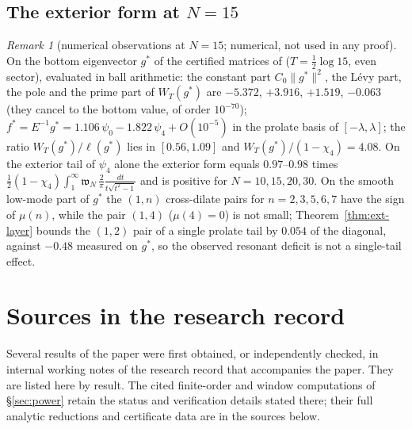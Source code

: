 \documentclass[11pt]{amsart}
\theoremstyle{definition}
\theoremstyle{remark}
\newtheorem{remark}[theorem]{Remark}
\begin{document}
\subsection{The exterior form at $N=15$}
\begin{remark}[numerical observations at $N=15$; numerical, not used in any proof]\label{rem:ext-latnum}
On the bottom eigenvector $g^*$ of the certified matrices of \cite{Mori15} ($T=\frac12\log15$, even sector), evaluated in
ball arithmetic: the constant part $C_0\|g^*\|^2$, the L\'evy part, the pole and the prime part of $W_T(g^*)$ are $-5.372$, $+3.916$, $+1.519$, $-0.063$ (they cancel to the bottom value, of order $10^{-70}$); $f^*=E^{-1}g^*=1.106\,\psi_0-1.822\,\psi_4+O(10^{-5})$ in the prolate basis of $[-\lambda,\lambda]$; the ratio
$W_T(g^*)/\ell(g^*)$ lies in $[0.56,1.09]$ and $W_T(g^*)/(1-\chi_4)=4.08$. On the exterior tail of $\psi_4$ alone the exterior form
equals $0.97$--$0.98$ times $\frac12(1-\chi_4)\int_1^\infty\mathfrak w_N\,\frac{2}{\pi}\frac{dt}{t\sqrt{t^2-1}}$ and is positive for
$N=10,15,20,30$. On the smooth low-mode part of $g^*$ the $(1,n)$ cross-dilate pairs for $n=2,3,5,6,7$ have the sign of $\mu(n)$,
while the pair $(1,4)$ ($\mu(4)=0$) is not small; Theorem~\ref{thm:ext-layer} bounds the $(1,2)$ pair of a single prolate tail by
$0.054$ of the diagonal, against $-0.48$ measured on $g^*$, so the observed resonant deficit is not a single-tail effect.
\end{remark}

\section{Sources in the research record}\label{app:sources}

Several results of the paper were first obtained, or independently checked, in internal working notes of the
research record that accompanies the paper. They are listed here by result. The cited finite-order and
window computations of \S\ref{sec:power} retain the status and verification details stated there; their
full analytic reductions and certificate data are in the sources below.
\end{document}
